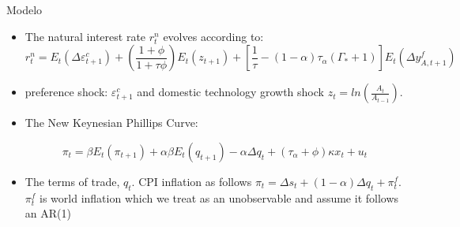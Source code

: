 \documentclass[9pt]{beamer}
\let\olditem\item
\renewcommand{\item}{%
\olditem\vspace{\fill}}
\begin{document}
\begin{frame}{Modelo}
\begin{itemize}
\item The natural interest rate $r_t^{n}$ evolves according to:
\begin{equation*}
    r_t^{n} = E_t(\Delta \varepsilon_{t+1}^{c}) + \left( \frac{1 + \phi}{1 + \tau \phi} \right)E_t(z_{t+1}) + \left[\frac{1}{\tau} -(1 - \alpha)\tau_{\alpha}(\Gamma_{*}+1)   \right]E_t(\Delta y_{A,t+1}^{f})
\end{equation*}

\item preference shock: $\varepsilon_{t+1}^{c}$ and domestic technology
growth shock $z_t = ln\left( \frac{A_t}{A_{t-1}} \right)$.

\item The New Keynesian Phillips Curve:

\begin{equation*}
    \pi_t = \beta E_t(\pi_{t+1} ) + \alpha \beta E_t(q_{t+1}) - \alpha \Delta q_t + (\tau_{\alpha} + \phi) \kappa x_t + u_t
\end{equation*}

\item The terms of trade, $q_t$. CPI inflation as follows $\pi_t = \Delta s_t + (1 - \alpha) \Delta q_t + \pi_t^{f} $. $\pi_t^{f}$ is world inflation which we treat as an unobservable and assume it follows an  AR(1)


\end{itemize}
\end{frame}
\end{document}
